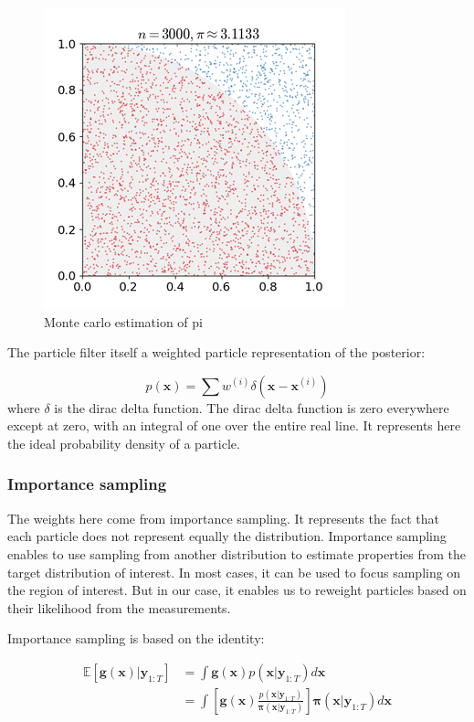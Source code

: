 \documentclass[12pt,]{article}
\begin{document}
\begin{figure}
\centering
\includegraphics{mc.gif}
\caption{Monte carlo estimation of pi}
\end{figure}

The particle filter itself a weighted particle representation of the
posterior:

\[p(\mathbf{x}) = \sum w^{(i)}\delta(\mathbf{x} - \mathbf{x}^{(i)})\]
where \(\delta\) is the dirac delta function. The dirac delta function
is zero everywhere except at zero, with an integral of one over the
entire real line. It represents here the ideal probability density of a
particle.

\subsubsection{Importance sampling}\label{importance-sampling}

The weights here come from importance sampling. It represents the fact
that each particle does not represent equally the distribution.
Importance sampling enables to use sampling from another distribution to
estimate properties from the target distribution of interest. In most
cases, it can be used to focus sampling on the region of interest. But
in our case, it enables us to reweight particles based on their
likelihood from the measurements.

Importance sampling is based on the identity:

\[
\begin{aligned}
\mathbb{E}[\mathbf{g}(\mathbf{x}) | \mathbf{y}_{1:T}] &= \int \mathbf{g}(\mathbf{x})p(\mathbf{x}|\mathbf{y}_{1:T})d\mathbf{x} \\
&= \int \left [\mathbf{g}(\mathbf{x})\frac{p(\mathbf{x}|\mathbf{y}_{1:T})}{\mathbf{\pi}(\mathbf{x}|\mathbf{y}_{1:T})} \right ] \mathbf{\pi}(\mathbf{x}|\mathbf{y}_{1:T}) d\mathbf{x} 
\end{aligned}
\]
\end{document}
